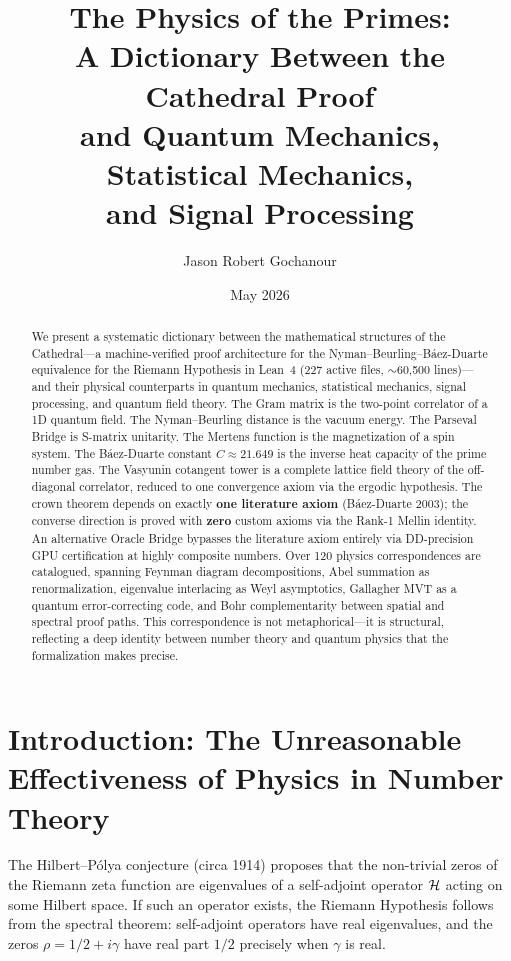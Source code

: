\documentclass[11pt,a4paper]{article}
\title{%
  The Physics of the Primes:\\
  A Dictionary Between the Cathedral Proof\\
  and Quantum Mechanics, Statistical Mechanics,\\
  and Signal Processing%
}
\author{
  Jason Robert Gochanour
}
\date{May 2026}
\begin{document}
\maketitle

\begin{abstract}
We present a systematic dictionary between the mathematical structures
of the Cathedral---a machine-verified proof architecture for the
Nyman--Beurling--B\'aez-Duarte equivalence for the Riemann Hypothesis
in Lean~4 (227 active files, $\sim$60{,}500 lines)---and their physical
counterparts in quantum mechanics, statistical mechanics, signal
processing, and quantum field theory.
The Gram matrix is the two-point correlator of a 1D quantum field.
The Nyman--Beurling distance is the vacuum energy.
The Parseval Bridge is S-matrix unitarity.
The Mertens function is the magnetization of a spin system.
The B\'aez-Duarte constant $C \approx 21.649$ is the inverse heat
capacity of the prime number gas.
The Vasyunin cotangent tower is a complete lattice field theory
of the off-diagonal correlator, reduced to one convergence axiom
via the ergodic hypothesis.
The crown theorem depends on exactly \textbf{one literature axiom}
(B\'aez-Duarte 2003); the converse direction is proved with
\textbf{zero} custom axioms via the Rank-1 Mellin identity.
An alternative Oracle Bridge bypasses the literature axiom entirely
via DD-precision GPU certification at highly composite numbers.
Over 120 physics correspondences are catalogued, spanning
Feynman diagram decompositions, Abel summation as renormalization,
eigenvalue interlacing as Weyl asymptotics, Gallagher MVT as a
quantum error-correcting code, and Bohr complementarity between
spatial and spectral proof paths.
This correspondence is not metaphorical---it is structural,
reflecting a deep identity between number theory and quantum physics
that the formalization makes precise.
\end{abstract}

\section{Introduction: The Unreasonable Effectiveness of Physics in Number Theory}

The Hilbert--P\'olya conjecture (circa 1914) proposes that the non-trivial
zeros of the Riemann zeta function are eigenvalues of a self-adjoint operator
$\mathcal{H}$ acting on some Hilbert space. If such an operator exists, the Riemann
Hypothesis follows from the spectral theorem: self-adjoint operators have
real eigenvalues, and the zeros $\rho = 1/2 + i\gamma$ have real part $1/2$
precisely when $\gamma$ is real.
\end{document}
